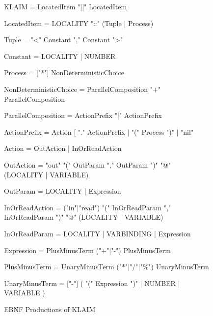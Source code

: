 \begin{figure}
\begin{codeblock}
KLAIM = 
  LocatedItem { "||" LocatedItem }                

LocatedItem = 
  LOCALITY "::" (Tuple | Process)

Tuple = 
  "<" Constant { "," Constant } ">"

Constant = 
  LOCALITY | NUMBER

Process = 
  ["*"] NonDeterministicChoice

NonDeterministicChoice =  
  ParallelComposition { "+" ParallelComposition }

ParallelComposition = 
  ActionPrefix { "|" ActionPrefix }

ActionPrefix = 
  Action [ "." ActionPrefix
  | "(" Process ")"  
  | "nil"

Action = 
  OutAction | InOrReadAction

OutAction = 
  "out" 
  "(" OutParam { "," OutParam } ")" 
  "@" (LOCALITY | VARIABLE)

OutParam = 
  LOCALITY | Expression

InOrReadAction = 
  ("in"|"read") 
  "(" InOrReadParam {"," InOrReadParam } ")" 
  "@" (LOCALITY | VARIABLE)

InOrReadParam = 
  LOCALITY | VARBINDING | Expression

Expression = 
  PlusMinusTerm { ("+"|"-") PlusMinusTerm }

PlusMinusTerm = 
  UnaryMinusTerm { ("*"|"/"|"\%") UnaryMinusTerm }

UnaryMinusTerm = 
  ["-"] 
  ( 
    "(" Expression ")" 
    | 
    NUMBER 
    | 
    VARIABLE 
  )

	\end{codeblock}
	\caption{EBNF Productions of KLAIM}
	\label{fig:klaim_ebnf}
	\end{figure}


